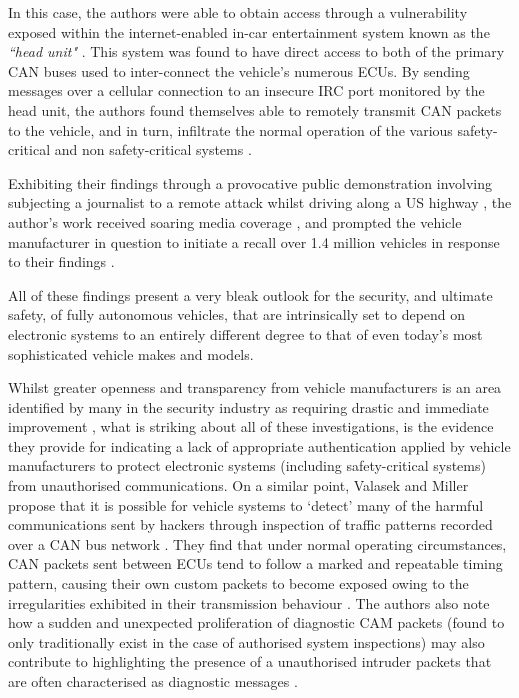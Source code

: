 \documentclass[conference]{IEEEtran}
\begin{document}
In this case, the authors were able to obtain access through a vulnerability exposed within the internet-enabled in-car entertainment system known as the \textit{``head unit"} \cite{valasek-2}. This system was found to have direct access to both of the primary CAN buses used to inter-connect the vehicle's numerous ECUs. By sending messages over a cellular connection to an insecure IRC port monitored by the head unit, the authors found themselves able to remotely transmit CAN packets to the vehicle, and in turn, infiltrate the normal operation of the various safety-critical and non safety-critical systems \cite{valasek-2}. 

Exhibiting their findings through a provocative public demonstration involving subjecting a journalist to a remote attack whilst driving along a US highway \cite{wired}, the author's work received soaring media coverage \cite{ieee-jeep,  washingtonpost-jeep}, and prompted the vehicle manufacturer in question to initiate a recall over 1.4 million vehicles in response to their findings \cite{bbc-recall}.

All of these findings present a very bleak outlook for the security, and ultimate safety, of fully autonomous vehicles, that are intrinsically set to depend on electronic systems to an entirely different degree to that of even today's most sophisticated vehicle makes and models. 

Whilst greater openness and transparency from vehicle manufacturers is an area identified by many in the security industry as requiring drastic and immediate improvement \cite{valasek-1, valasek-2, iet, yagdereli}, what is striking about all of these investigations, is the evidence they provide for indicating a lack of appropriate authentication applied by vehicle manufacturers to protect electronic systems (including safety-critical systems) from unauthorised communications. On a similar point, Valasek and Miller propose that it is possible for vehicle systems to `detect' many of the harmful communications sent by hackers through inspection of traffic patterns recorded over a CAN bus network \cite{valasek-1}. They find that under normal operating circumstances, CAN packets sent between ECUs tend to follow a marked and repeatable timing pattern, causing their own custom packets to become exposed owing to the irregularities exhibited in their transmission behaviour \cite{valasek-1}. The authors also note how a sudden and unexpected proliferation of diagnostic CAM packets (found to only traditionally exist in the case of authorised system inspections) may also contribute to highlighting the presence of a unauthorised  intruder packets that are often characterised as diagnostic messages \cite{valasek-1}.  
\end{document}
